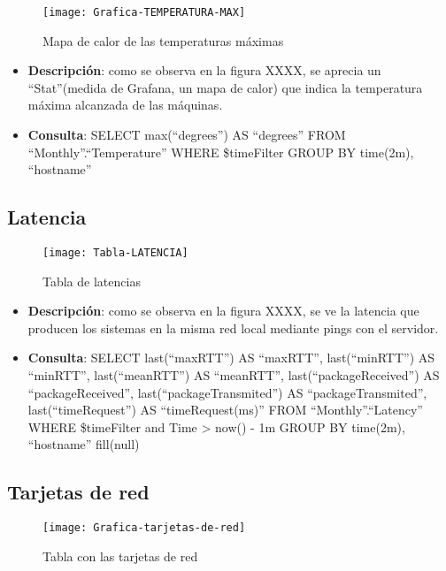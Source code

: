 \documentclass[ spanish, a4paper, 12pt, oneside]{report}
\begin{document}
\begin{figure}[!h]
   \centering
   \texttt{[image: Grafica-TEMPERATURA-MAX]}\\
      \caption{\label{fig: Mapa de calor de las temperaturas máximas} Mapa de calor de las temperaturas máximas}
\end{figure}

\begin{itemize}
   \item \textbf{Descripción}: como se observa en la figura XXXX, se aprecia un ``Stat''(medida de Grafana, un mapa de calor) que indica la temperatura máxima alcanzada de las máquinas.
   \item \textbf{Consulta}: SELECT max(``degrees'') AS ``degrees'' FROM ``Monthly''.``Temperature'' WHERE \$timeFilter GROUP BY time(2m), ``hostname''
\end{itemize}

\subsection{Latencia}

\begin{figure}[!h]
   \centering
   \texttt{[image: Tabla-LATENCIA]}\\
      \caption{\label{fig: Tabla de latencias} Tabla de latencias}
\end{figure}

\begin{itemize}
   \item \textbf{Descripción}: como se observa en la figura XXXX, se ve la latencia que producen los sistemas en la misma red local mediante pings con el servidor.
   \item \textbf{Consulta}: SELECT last(``maxRTT'') AS ``maxRTT'', last(``minRTT'') AS ``minRTT'', last(``meanRTT'') AS ``meanRTT'', last(``packageReceived'') AS ``packageReceived'', last(``packageTransmited'') AS ``packageTransmited'', last(``timeRequest'') AS ``timeRequest(ms)'' FROM ``Monthly''.``Latency'' WHERE \$timeFilter and Time > now() - 1m GROUP BY time(2m), ``hostname'' fill(null)
\end{itemize}

\subsection{Tarjetas de red}

\begin{figure}[!h]
   \centering
   \texttt{[image: Grafica-tarjetas-de-red]}\\
      \caption{\label{fig: Tabla con las tarjetas de red} Tabla con las tarjetas de red}
\end{figure}
\end{document}
